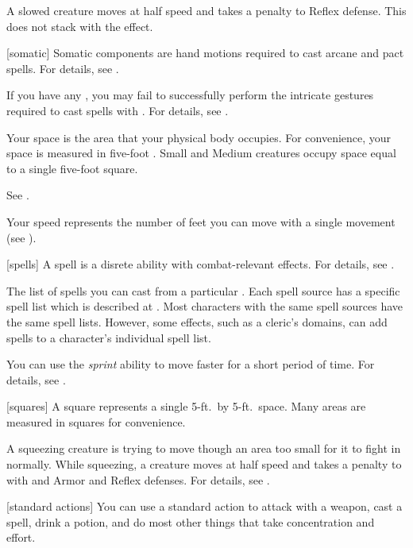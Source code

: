  A slowed creature moves at half speed and takes a  penalty to Reflex defense.
This does not stack with the  effect.

[somatic] Somatic components are hand motions required to cast arcane and pact spells.
For details, see .

 If you have any , you may fail to successfully perform the intricate gestures required to cast spells with .
For details, see .

 Your space is the area that your physical body occupies.
For convenience, your space is measured in five-foot .
Small and Medium creatures occupy space equal to a single five-foot square.

 See .

 Your speed represents the number of feet you can move with a single movement (see ).

[spells] A spell is a disrete  ability with combat-relevant effects.
For details, see .

 The list of spells you can cast from a particular .
Each spell source has a specific spell list which is described at .
Most characters with the same spell sources have the same spell lists.
However, some effects, such as a cleric's domains, can add spells to a character's individual spell list.

 You can use the \textit{sprint} ability to move faster for a short period of time.
For details, see .

[squares] A square represents a single 5-ft.\ by 5-ft.\ space.
Many areas are measured in squares for convenience.

 A squeezing creature is trying to move though an area too small for it to fight in normally.
While squeezing, a creature moves at half speed and takes a  penalty to  with  and Armor and Reflex defenses.
For details, see .

[standard actions] You can use a standard action to attack with a weapon, cast a spell, drink a potion, and do most other things that take concentration and effort.

